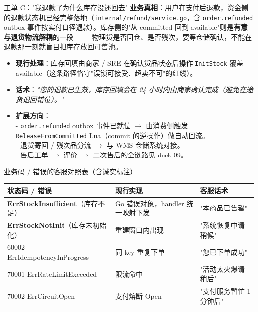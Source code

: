 \documentclass[aspectratio=169,11pt]{beamer}
\begin{document}
\begin{frame}[shrink]{工单 C："我退款了为什么库存没还回去"}
\textbf{业务真相}：用户在支付后退款，资金侧的退款状态机已经完整落地（\texttt{internal/refund/service.go}，含 \texttt{order.refunded} outbox 事件按实付口径退款）。库存侧的"从 committed 回到 available"则是\textbf{有意与退货物流解耦}的一段 —— 物理货是否回仓、是否残次，要等仓储确认，不能在退款那一刻就盲目把库存放回可售池。
\vspace{1mm}
\begin{itemize}
  \item \textbf{现行处理}：库存回填由商家 / SRE 在确认货品状态后操作 \texttt{InitStock} 覆盖 available（这条路径恪守"误锁可接受、超卖不可"的红线）。
  \item \textbf{话术}：\textit{"您的退款已生效，库存回填会在 24 小时内由商家确认完成（避免在途货退回错位）。"}
  \item \textbf{扩展方向}：\\
  \quad - \texttt{order.refunded} outbox 事件已就位 $\to$ 由消费侧触发 \texttt{ReleaseFromCommitted} Lua（commit 的逆操作）做自动回流。\\
  \quad - 退货寄回 / 残次品分流 $\to$ 与 WMS 仓储系统对接。\\
  \quad - 售后工单 $\to$ 评价 $\to$ 二次售后的全链路见 deck 09。
\end{itemize}
\end{frame}

\begin{frame}[shrink]{业务码 / 错误的客服对照表（含诚实标注）}
\footnotesize
\begin{center}
\begin{tabular}{@{}p{4.0cm}p{3.6cm}p{3.4cm}@{}}
\toprule
状态码 / 错误 & 现行实现 & 客服话术 \\
\midrule
\textbf{ErrStockInsufficient}（库存不足） & Go 错误对象，handler 统一映射下发 & "本商品已售罄" \\
\textbf{ErrStockNotInit}（库存未初始化） & 重建窗口内出现 & "系统恢复中请稍候" \\
60002 ErrIdempotencyInProgress & 同 key 重复下单 & "您已下单成功" \\
70001 ErrRateLimitExceeded & 限流命中 & "活动太火爆请稍后" \\
70002 ErrCircuitOpen      & 支付熔断 Open & "支付服务暂忙 1 分钟后" \\
\bottomrule
\end{tabular}
\end{center}
\smallskip
{}
\end{frame}
\end{document}
